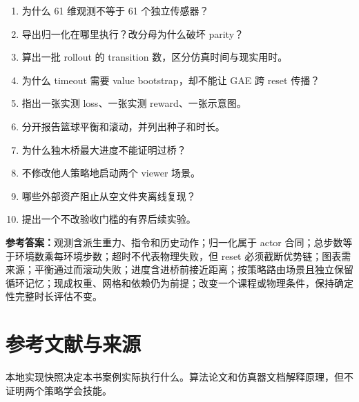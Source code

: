\documentclass[
  chinese,
  11pt,
  letterpaper,
]{article}
\providecommand{\tightlist}{%
  \setlength{\itemsep}{0pt}\setlength{\parskip}{0pt}}
\begin{document}
\begin{enumerate}
\def\labelenumi{\arabic{enumi}.}
\tightlist
\item
  为什么 61 维观测不等于 61 个独立传感器？
\item
  导出归一化在哪里执行？改分母为什么破坏 parity？
\item
  算出一批 rollout 的 transition 数，区分仿真时间与现实用时。
\item
  为什么 timeout 需要 value bootstrap，却不能让 GAE 跨 reset 传播？
\item
  指出一张实测 loss、一张实测 reward、一张示意图。
\item
  分开报告篮球平衡和滚动，并列出种子和时长。
\item
  为什么独木桥最大进度不能证明过桥？
\item
  不修改他人策略地启动两个 viewer 场景。
\item
  哪些外部资产阻止从空文件夹离线复现？
\item
  提出一个不改验收门槛的有界后续实验。
\end{enumerate}

\textbf{参考答案：}观测含派生重力、指令和历史动作；归一化属于 actor
合同；总步数等于环境数乘每环境步数；超时不代表物理失败，但 reset
必须截断优势链；图表需来源；平衡通过而滚动失败；进度含进桥前接近距离；按策略路由场景且独立保留循环记忆；现成权重、网格和依赖仍为前提；改变一个课程或物理条件，保持确定性完整时长评估不变。

\section{参考文献与来源}\label{ux53c2ux8003ux6587ux732eux4e0eux6765ux6e90}

本地实现快照决定本书案例实际执行什么。算法论文和仿真器文档解释原理，但不证明两个策略学会技能。
\end{document}
